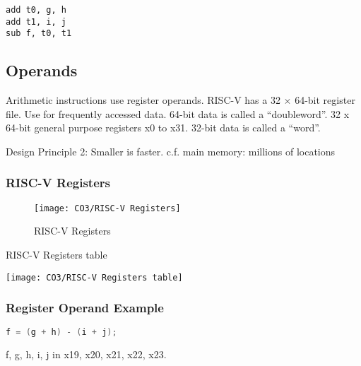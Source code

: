 \begin{lstlisting}[language={[x86masm]Assembler}, title={Compiled RISC-V code}]
add t0, g, h
add t1, i, j
sub f, t0, t1
\end{lstlisting}



\subsection{Operands}
Arithmetic instructions use register operands. RISC-V has a 32 $\times$ 64-bit register file. Use for frequently accessed data. 64-bit data is called a ``doubleword''. 32 x 64-bit general purpose registers x0 to x31. 32-bit data is called a ``word''. 

Design Principle 2: Smaller is faster. c.f. main memory: millions of locations

\subsubsection{RISC-V Registers}

\begin{figure}[!htb]
    \centering
    \texttt{[image: CO3/RISC-V Registers]}
    \caption{RISC-V Registers}
\end{figure}

\begin{table}[!htb]
    \centering
    \caption{RISC-V Registers table}
    \texttt{[image: CO3/RISC-V Registers table]}
\end{table}


\subsubsection{Register Operand Example}
\begin{lstlisting}[language={C},title={C code}]
f = (g + h) - (i + j);
\end{lstlisting}
f, g, h, i, j in x19, x20, x21, x22, x23. 

